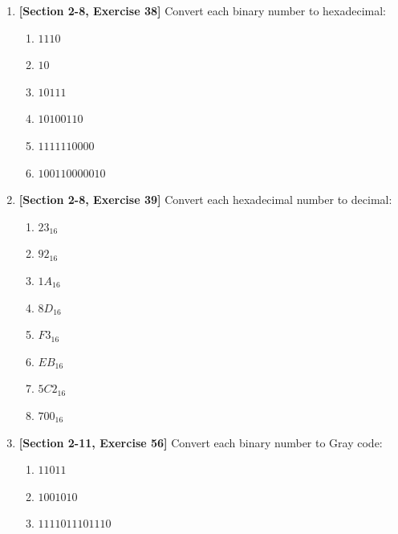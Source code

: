 \documentclass[11pt]{article}
\begin{document}
\begin{enumerate}



\item \textbf{[Section 2-8, Exercise 38]}
Convert each binary number to hexadecimal:

\begin{enumerate}[label=(\alph*)]
    \item $1110$
    \item $10$
    \item $10111$
    \item $10100110$
    \item $1111110000$
    \item $100110000010$
\end{enumerate}



\item \textbf{[Section 2-8, Exercise 39]}
Convert each hexadecimal number to decimal:

\begin{enumerate}[label=(\alph*)]
    \item $23_{16}$
    \item $92_{16}$
    \item $1A_{16}$
    \item $8D_{16}$
    \item $F3_{16}$
    \item $EB_{16}$
    \item $5C2_{16}$
    \item $700_{16}$
\end{enumerate}



\item \textbf{[Section 2-11, Exercise 56]}
Convert each binary number to Gray code:

\begin{enumerate}[label=(\alph*)]
    \item $11011$
    \item $1001010$
    \item $1111011101110$
\end{enumerate}



\end{enumerate}
\end{document}
